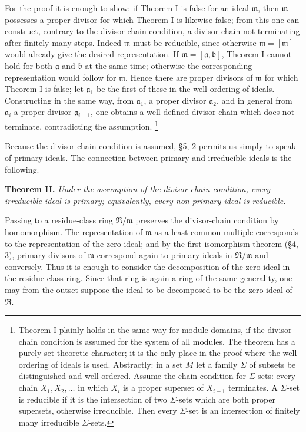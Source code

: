 \documentclass[11pt]{article}
\providecommand{\mR}{\mathfrak{R}}
\providecommand{\ma}{\mathfrak{a}}
\providecommand{\mb}{\mathfrak{b}}
\providecommand{\mm}{\mathfrak{m}}
\begin{document}
For the proof it is enough to show: if Theorem I is false for an ideal $\mm$, then $\mm$ possesses a proper divisor for which Theorem I is likewise false; from this one can construct, contrary to the divisor-chain condition, a divisor chain not terminating after finitely many steps. Indeed $\mm$ must be reducible, since otherwise $\mm=[\mm]$ would already give the desired representation. If $\mm=[\ma,\mb]$, Theorem I cannot hold for both $\ma$ and $\mb$ at the same time; otherwise the corresponding representation would follow for $\mm$. Hence there are proper divisors of $\mm$ for which Theorem I is false; let $\ma_1$ be the first of these in the well-ordering of ideals. Constructing in the same way, from $\ma_1$, a proper divisor $\ma_2$, and in general from $\ma_i$ a proper divisor $\ma_{i+1}$, one obtains a well-defined divisor chain which does not terminate, contradicting the assumption.
\footnote{Theorem I plainly holds in the same way for module domains, if the divisor-chain condition is assumed for the system of all modules. The theorem has a purely set-theoretic character; it is the only place in the proof where the well-ordering of ideals is used. Abstractly: in a set $M$ let a family $\Sigma$ of subsets be distinguished and well-ordered. Assume the chain condition for $\Sigma$-sets: every chain $X_1,X_2,\ldots$ in which $X_i$ is a proper superset of $X_{i-1}$ terminates. A $\Sigma$-set is reducible if it is the intersection of two $\Sigma$-sets which are both proper supersets, otherwise irreducible. Then every $\Sigma$-set is an intersection of finitely many irreducible $\Sigma$-sets.}

Because the divisor-chain condition is assumed, §5, 2 permits us simply to speak of primary ideals. The connection between primary and irreducible ideals is the following.

\textbf{Theorem II.} \emph{Under the assumption of the divisor-chain condition, every irreducible ideal is primary; equivalently, every non-primary ideal is reducible.}

Passing to a residue-class ring $\mR/\mm$ preserves the divisor-chain condition by homomorphism. The representation of $\mm$ as a least common multiple corresponds to the representation of the zero ideal; and by the first isomorphism theorem (§4, 3), primary divisors of $\mm$ correspond again to primary ideals in $\mR/\mm$ and conversely. Thus it is enough to consider the decomposition of the zero ideal in the residue-class ring. Since that ring is again a ring of the same generality, one may from the outset suppose the ideal to be decomposed to be the zero ideal of $\mR$.
\end{document}
